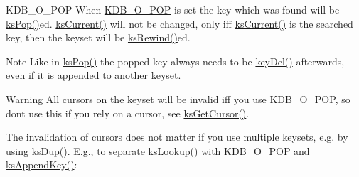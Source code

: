 \begin{DoxyParagraph}{K\+D\+B\+\_\+\+O\+\_\+\+P\+OP}
When \hyperlink{group__keyset_gga98a3d6a4016c9dad9cbd1a99a9c2a45aa52fb5f2cc86773d393da62bebebf7984}{K\+D\+B\+\_\+\+O\+\_\+\+P\+OP} is set the key which was found will be \hyperlink{group__keyset_gae42530b04defb772059de0600159cf69}{ks\+Pop()}ed. \hyperlink{group__keyset_ga4287b9416912c5f2ab9c195cb74fb094}{ks\+Current()} will not be changed, only iff \hyperlink{group__keyset_ga4287b9416912c5f2ab9c195cb74fb094}{ks\+Current()} is the searched key, then the keyset will be \hyperlink{group__keyset_gabe793ff51f1728e3429c84a8a9086b70}{ks\+Rewind()}ed.
\end{DoxyParagraph}
\begin{DoxyNote}{Note}
Like in \hyperlink{group__keyset_gae42530b04defb772059de0600159cf69}{ks\+Pop()} the popped key always needs to be \hyperlink{group__key_ga3df95bbc2494e3e6703ece5639be5bb1}{key\+Del()} afterwards, even if it is appended to another keyset.
\end{DoxyNote}
\begin{DoxyWarning}{Warning}
All cursors on the keyset will be invalid iff you use \hyperlink{group__keyset_gga98a3d6a4016c9dad9cbd1a99a9c2a45aa52fb5f2cc86773d393da62bebebf7984}{K\+D\+B\+\_\+\+O\+\_\+\+P\+OP}, so don\textquotesingle{}t use this if you rely on a cursor, see \hyperlink{group__keyset_gaffe507ab9281c322eb16c3e992075d29}{ks\+Get\+Cursor()}.
\end{DoxyWarning}
The invalidation of cursors does not matter if you use multiple keysets, e.\+g. by using \hyperlink{group__keyset_gac59e4b328245463f1451f68d5106151c}{ks\+Dup()}. E.\+g., to separate \hyperlink{group__keyset_gaa34fc43a081e6b01e4120daa6c112004}{ks\+Lookup()} with \hyperlink{group__keyset_gga98a3d6a4016c9dad9cbd1a99a9c2a45aa52fb5f2cc86773d393da62bebebf7984}{K\+D\+B\+\_\+\+O\+\_\+\+P\+OP} and \hyperlink{group__keyset_gaa5a1d467a4d71041edce68ea7748ce45}{ks\+Append\+Key()}\+:


